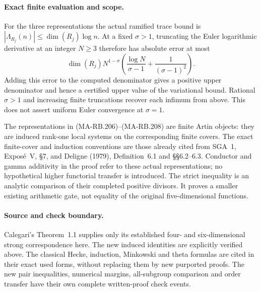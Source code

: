 \paragraph{Exact finite evaluation and scope.}
For the three representations the actual ramified trace bound
is \(|\Lambda_{R_j}(n)|\le\dim(R_j)\log n\).
At a fixed \(\sigma>1\), truncating the Euler logarithmic
derivative at an integer \(N\ge3\) therefore has absolute error at most
\[
 \dim(R_j)N^{1-\sigma}
        \left(\frac{\log N}{\sigma-1}
                          +\frac1{(\sigma-1)^2}\right).
 \tag{MA-RB.240}
\]
Adding this error to the computed denominator gives a positive
upper denominator and hence a certified upper value of the
variational bound. Rational \(\sigma>1\) and increasing finite
truncations recover each infimum from above. This does not
assert uniform Euler convergence at \(\sigma=1\).

The representations in (MA-RB.206)--(MA-RB.208) are finite
Artin objects: they are induced rank-one local systems on
the corresponding finite covers. The exact finite-cover and
induction conventions are those already cited from SGA~1,
Expos\'e~V, \S7, and Deligne (1979), Definition~6.1 and
\S\S6.2--6.3. Conductor and gamma additivity in the proof
refer to these actual representations; no hypothetical higher
functorial transfer is introduced. The strict inequality is an
analytic comparison of their completed positive divisors.
It proves a smaller existing arithmetic gate, not equality
of the original five-dimensional functions.

\paragraph{Source and check boundary.}
Calegari's Theorem~1.1 supplies only its established
four- and six-dimensional strong correspondence here.
The new induced identities are explicitly verified above.
The classical Hecke, induction, Minkowski and theta formulas
are cited in their exact used forms, without replacing them
by new purported proofs. The new pair inequalities, numerical
margins, all-subgroup comparison and order transfer have
their own complete written-proof check events.
